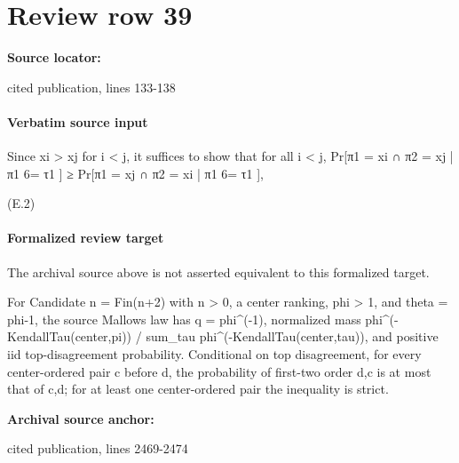 \documentclass[10pt]{article}
\begin{document}
\section*{Review row 39}
\textbf{Source locator:} {\footnotesize\raggedright cited publication, lines 133-\allowbreak{}138\par}
\paragraph{Verbatim source input}
\begin{ReviewVerbatim}
Since xi > xj for i < j, it suffices to show that for all i < j,
Pr[π1 = xi ∩ π2 = xj | π1 6= τ1 ] ≥ Pr[π1 = xj ∩ π2 = xi | π1 6= τ1 ],

(E.2)
\end{ReviewVerbatim}


\paragraph{Formalized review target}
The archival source above is not asserted equivalent to this formalized target.
\begin{ReviewVerbatim}
For Candidate n = Fin(n+2) with n > 0, a center ranking, phi > 1, and theta = phi-1, the source Mallows law has q = phi^(-1), normalized mass phi^(-KendallTau(center,pi)) / sum_tau phi^(-KendallTau(center,tau)), and positive iid top-disagreement probability. Conditional on top disagreement, for every center-ordered pair c before d, the probability of first-two order d,c is at most that of c,d; for at least one center-ordered pair the inequality is strict.
\end{ReviewVerbatim}

\textbf{Archival source anchor:} {\footnotesize\raggedright cited publication, lines 2469-\allowbreak{}2474\par}
\end{document}
